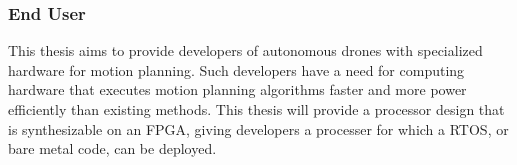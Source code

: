     \subsubsection*{End User}
    This thesis aims to provide developers of autonomous drones with specialized hardware for motion planning. Such developers have a need for computing hardware that executes motion planning algorithms faster and more power efficiently than existing methods. This thesis will provide a processor design that is synthesizable on an \ac{FPGA}, giving developers a processer for which a \ac{RTOS}, or bare metal code, can be deployed.
